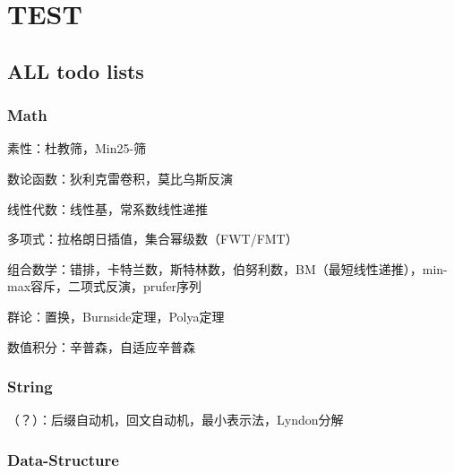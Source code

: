 \section{TEST}

\subsection{ALL todo lists}

\subsubsection{Math}

\begin{todolist}

\item 素性：杜教筛，Min25-筛

\item 数论函数：狄利克雷卷积，莫比乌斯反演

\item 线性代数：线性基，常系数线性递推

\item 多项式：拉格朗日插值，集合幂级数（FWT/FMT）

\item 组合数学：错排，卡特兰数，斯特林数，伯努利数，BM（最短线性递推），min-max容斥，二项式反演，prufer序列

\item 群论：置换，Burnside定理，Polya定理

\item 数值积分：辛普森，自适应辛普森

\end{todolist}

\subsubsection{String}

\begin{todolist}

\item （？）：后缀自动机，回文自动机，最小表示法，Lyndon分解

\end{todolist}

\subsubsection{Data-Structure}

